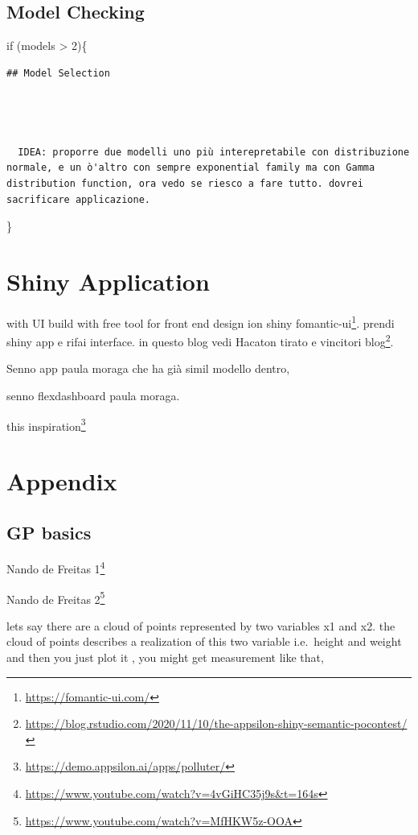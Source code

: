 \documentclass[
  12pt,
  a4paper,
  oneside]{book}
\DeclareRobustCommand{\href}[2]{#2\footnote{\url{#1}}}
\theoremstyle{definition}
\theoremstyle{definition}
\theoremstyle{definition}
\theoremstyle{remark}
\begin{document}
\hypertarget{model-checking-1}{%
\section{Model Checking}\label{model-checking-1}}

if (models \textgreater{} 2)\{

\begin{lstlisting}
## Model Selection




  IDEA: proporre due modelli uno più interepretabile con distribuzione normale, e un ò'altro con sempre exponential family ma con Gamma distribution function, ora vedo se riesco a fare tutto. dovrei sacrificare applicazione.
\end{lstlisting}

\}

\hypertarget{application}{%
\chapter{Shiny Application}\label{application}}

with UI build with free tool for front end design ion shiny \href{https://fomantic-ui.com/}{fomantic-ui}. prendi shiny app e rifai interface. in questo blog vedi Hacaton tirato e vincitori \href{https://blog.rstudio.com/2020/11/10/the-appsilon-shiny-semantic-pocontest/}{blog}.

Senno app paula moraga che ha già simil modello dentro,

senno flexdashboard paula moraga.

\href{https://demo.appsilon.ai/apps/polluter/}{this inspiration}

\hypertarget{appendix}{%
\chapter*{Appendix}\label{appendix}}

\hypertarget{gp-basics}{%
\section{GP basics}\label{gp-basics}}

\href{https://www.youtube.com/watch?v=4vGiHC35j9s\&t=164s}{Nando de Freitas 1}

\href{https://www.youtube.com/watch?v=MfHKW5z-OOA}{Nando de Freitas 2}

lets say there are a cloud of points represented by two variables x1 and x2. the cloud of points describes a realization of this two variable i.e.~height and weight and then you just plot it , you might get measurement like that,
\end{document}
